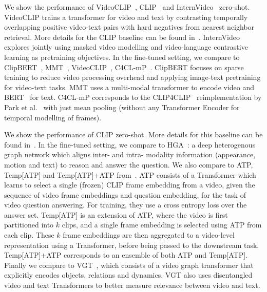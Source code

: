  We show the performance of VideoCLIP~\cite{xu-etal-2021-videoclip}, CLIP~\cite{Radford2021CLIP} and InternVideo~\cite{wang2022internvideo} zero-shot. VideoCLIP trains a transformer for video and text by contrasting temporally overlapping positive video-text pairs with hard negatives from nearest neighbor retrieval. More details for the CLIP baseline can be found in~\cite{Radford2021CLIP}. InternVideo explores jointly using masked video modelling and video-language contrastive learning as pretraining objectives. In the fine-tuned setting, we compare to ClipBERT~\cite{lei2021less}, MMT~\cite{gabeur2020mmt}, VideoCLIP~\cite{xu-etal-2021-videoclip}, C4CL-mP~\cite{park-etal-2022-exposing}. ClipBERT focuses on sparse training to reduce video processing overhead and applying image-text pretraining for video-text tasks. MMT uses a multi-modal transformer to encode video and BERT~\cite{devlin-etal-2019-bert} for text. C4CL-mP corresponds to the CLIP4CLIP~\cite{Luo2021CLIP4Clip} reimplementation by Park et al.~\cite{park-etal-2022-exposing} with just mean pooling (without any Transformer Encoder for temporal modelling of frames). 


  We show the performance of CLIP zero-shot. More details for this baseline can be found in~\cite{Radford2021CLIP}. In the fine-tuned setting, we compare to HGA~\cite{jiang2020reasoning}: a deep heterogenous graph network which aligns inter- and intra- modality information (appearance, motion and text) to reason and answer the question. We also compare to ATP, Temp[ATP] and Temp[ATP]+ATP from~\cite{buch2022revisiting}. ATP consists of a Transformer which learns to select a single (frozen) CLIP frame embedding from a video, given the sequence of video frame embeddings and question embedding, for the task of video question answering. For training, they use a cross entropy loss over the answer set. Temp[ATP] is an extension of ATP, where the video is first partitioned into $k$ clips, and a single frame embedding is selected using ATP from each clip. These $k$ frame embeddings are then aggregated to a video-level representation using a Transformer, before being passed to the downstream task. Temp[ATP]+ATP corresponds to an ensemble of both ATP and Temp[ATP]. Finally we compare to VGT~\cite{xiao2022video}, which consists of a video graph transformer that explicitly encodes objects, relations and dynamics. VGT also uses disentangled video and text Transformers to better measure relevance between video and text.  




